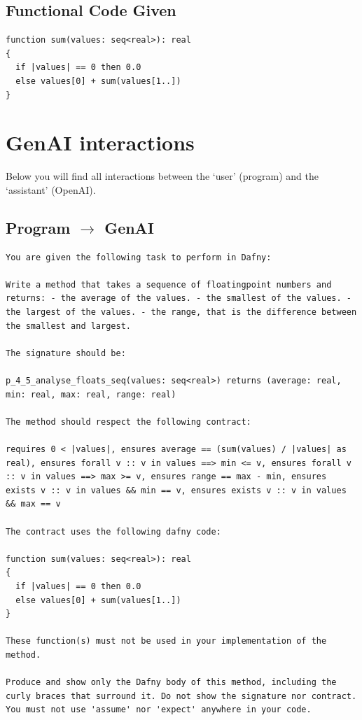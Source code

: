 \documentclass{article}
\begin{document}
\subsection*{Functional Code Given}
\begin{lstlisting}
function sum(values: seq<real>): real
{
  if |values| == 0 then 0.0
  else values[0] + sum(values[1..])
}
\end{lstlisting}
\clearpage
\section*{GenAI interactions}
Below you will find all interactions between the `user' (program) and the `assistant' (OpenAI).
\subsection*{Program $\rightarrow$ GenAI}
\begin{lstlisting}
You are given the following task to perform in Dafny:

Write a method that takes a sequence of floatingpoint numbers and returns: - the average of the values. - the smallest of the values. - the largest of the values. - the range, that is the difference between the smallest and largest.

The signature should be:

p_4_5_analyse_floats_seq(values: seq<real>) returns (average: real, min: real, max: real, range: real)

The method should respect the following contract:

requires 0 < |values|, ensures average == (sum(values) / |values| as real), ensures forall v :: v in values ==> min <= v, ensures forall v :: v in values ==> max >= v, ensures range == max - min, ensures exists v :: v in values && min == v, ensures exists v :: v in values && max == v

The contract uses the following dafny code:

function sum(values: seq<real>): real
{
  if |values| == 0 then 0.0
  else values[0] + sum(values[1..])
}

These function(s) must not be used in your implementation of the method.

Produce and show only the Dafny body of this method, including the curly braces that surround it. Do not show the signature nor contract. You must not use 'assume' nor 'expect' anywhere in your code.
\end{lstlisting}
\end{document}
